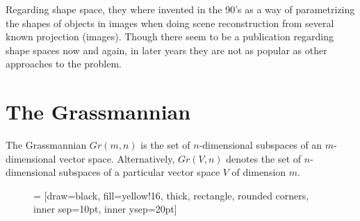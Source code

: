 \documentclass[a4paper,12pt]{book}
\theoremstyle{plain}
\theoremstyle{definition}
\begin{document}
Regarding shape space, they where invented in the 90's as a way of
parametrizing the shapes of objects in images when doing scene reconstruction
from several known projection (images). Though there seem to be a publication
regarding shape spaces now and again, in later years they are not as popular as
other approaches to the problem.


\section{The Grassmannian} %
\label{sec:the_grassmannian}
The Grassmannian \( Gr(m,n) \) is the set of \( n \)-dimensional subspaces of
an \( m \)-dimensional vector space.
Alternatively, \( Gr(V,n) \) denotes the set of \( n \)-dimensional subspaces
of a particular vector
space \( V \) of dimension \( m \).

\begin{figure}
	 = [draw=black, fill=yellow!16, thick,
	rectangle, rounded corners, inner sep=10pt, inner ysep=20pt]
\end{figure}
\end{document}
